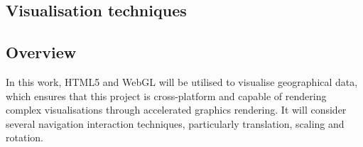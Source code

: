 \documentclass[
	fontsize=11pt
	headlines=2,
	footlines=2,
	parskip=half
]{scrartcl}
\begin{document}
{{			%





		}




		\subsection{Visualisation techniques} {


		}

		\subsection{Overview} {


			In this work, HTML5 and WebGL will be utilised to visualise geographical data, which ensures that this project is cross-platform and capable of rendering complex visualisations through accelerated graphics rendering. It will consider several navigation interaction techniques, particularly translation, scaling and rotation.

		}
	
	}
	
\end{document}
